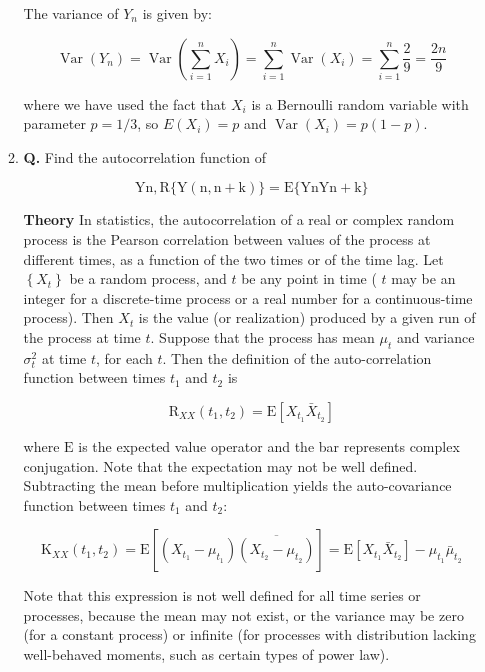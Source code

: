 \documentclass[main.tex]{subfiles}
\begin{document}
\begin{enumerate}
\begin{enumerate}
        The variance of $Y_n$ is given by:
        
        $$
        \operatorname{Var}\left(Y_n\right)=\operatorname{Var}\left(\sum_{i=1}^n X_i\right)=\sum_{i=1}^n \operatorname{Var}\left(X_i\right)=\sum_{i=1}^n \frac{2}{9}=\frac{2 n}{9}
        $$
        
        where we have used the fact that $X_i$ is a Bernoulli random variable with parameter $p=1/3$, so $E\left(X_i\right)=p$ and $\operatorname{Var}\left(X_i\right)=p(1-p)$.
        
        \item \textbf{Q.} Find the autocorrelation function of 
        
        $$
        \mathrm{Yn}, \mathrm{R}\{\mathrm{Y}(\mathrm{n}, \mathrm{n}+\mathrm{k})\}=\mathrm{E}\{\mathrm{Yn} \mathrm{Yn}+\mathrm{k}\}
        $$ 

        \textbf{Theory} In statistics, the autocorrelation of a real or complex random process is the Pearson correlation between values of the process at different times, as a function of the two times or of the time lag. Let $\left\{X_t\right\}$ be a random process, and $t$ be any point in time ( $t$ may be an integer for a discrete-time process or a real number for a continuous-time process). Then $X_t$ is the value (or realization) produced by a given run of the process at time $t$. Suppose that the process has mean $\mu_t$ and variance $\sigma_t^2$ at time $t$, for each $t$. Then the definition of the auto-correlation function between times $t_1$ and $t_2$ is 

        $$
        \mathrm{R}_{X X}\left(t_1, t_2\right)=\mathrm{E}\left[X_{t_1} \bar{X}_{t_2}\right]
        $$

        where $\mathrm{E}$ is the expected value operator and the bar represents complex conjugation. Note that the expectation may not be well defined. Subtracting the mean before multiplication yields the auto-covariance function between times $t_1$ and $t_2$:

        $$
        \mathrm{K}_{X X}\left(t_1, t_2\right)=\mathrm{E}\left[\left(X_{t_1}-\mu_{t_1}\right) \overline{\left(X_{t_2}-\mu_{t_2}\right)}\right]=\mathrm{E}\left[X_{t_1} \bar{X}_{t_2}\right]-\mu_{t_1} \bar{\mu}_{t_2}
        $$

        Note that this expression is not well defined for all time series or processes, because the mean may not exist, or the variance may be zero (for a constant process) or infinite (for processes with distribution lacking well-behaved moments, such as certain types of power law).
        

\end{enumerate}
\end{enumerate}
\end{document}
